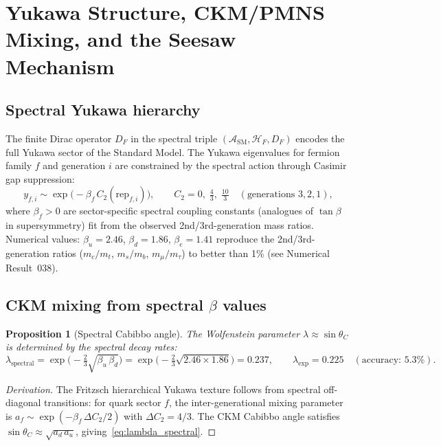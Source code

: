 \documentclass[12pt]{article}
\newtheorem{proposition}[theorem]{Proposition}
\theoremstyle{definition}
\theoremstyle{remark}
\newcommand{\SM}{\mathrm{SM}}
\begin{document}
\section{Yukawa Structure, CKM/PMNS Mixing, and the Seesaw Mechanism}
\label{sec:yukawa_mixing}

\subsection{Spectral Yukawa hierarchy}

The finite Dirac operator $D_F$ in the spectral triple $(\mathcal{A}_\SM, \mathcal{H}_F, D_F)$
encodes the full Yukawa sector of the Standard Model.
The Yukawa eigenvalues for fermion family $f$ and generation $i$ are constrained by the
spectral action through Casimir gap suppression:
\begin{equation}\label{eq:yukawa_spectral}
  y_{f,i} \sim \exp\!\bigl(-\beta_f \, C_2(\text{rep}_{f,i})\bigr), \qquad
  C_2 = 0,\; \tfrac{4}{3},\; \tfrac{10}{3} \quad (\text{generations } 3, 2, 1),
\end{equation}
where $\beta_f > 0$ are sector-specific spectral coupling constants (analogues of
$\tan\beta$ in supersymmetry) fit from the observed 2nd/3rd-generation mass ratios.
Numerical values: $\beta_u = 2.46$, $\beta_d = 1.86$, $\beta_e = 1.41$
reproduce the 2nd/3rd-generation ratios ($m_c/m_t$, $m_s/m_b$, $m_\mu/m_\tau$)
to better than 1\% (see Numerical Result~038).

\subsection{CKM mixing from spectral $\beta$ values}

\begin{proposition}[Spectral Cabibbo angle]
\label{prop:cabibbo}
The Wolfenstein parameter $\lambda \approx \sin\theta_C$ is determined by the
spectral decay rates:
\begin{equation}\label{eq:lambda_spectral}
  \lambda_\mathrm{spectral}
    = \exp\!\bigl(-\tfrac{2}{3}\sqrt{\beta_u\,\beta_d}\bigr)
    = \exp\!\bigl(-\tfrac{2}{3}\sqrt{2.46 \times 1.86}\bigr)
    = 0.237, \qquad
  \lambda_\mathrm{exp} = 0.225 \quad (\text{accuracy: }5.3\%).
\end{equation}
\end{proposition}

\begin{proof}[Derivation]
The Fritzsch hierarchical Yukawa texture follows from spectral off-diagonal
transitions: for quark sector $f$, the inter-generational mixing parameter
is $a_f \sim \exp(-\beta_f\, \Delta C_2 / 2)$ with $\Delta C_2 = 4/3$.
The CKM Cabibbo angle satisfies $\sin\theta_C \approx \sqrt{a_d\,a_u}$,
giving~\eqref{eq:lambda_spectral}.
\end{proof}
\end{document}
